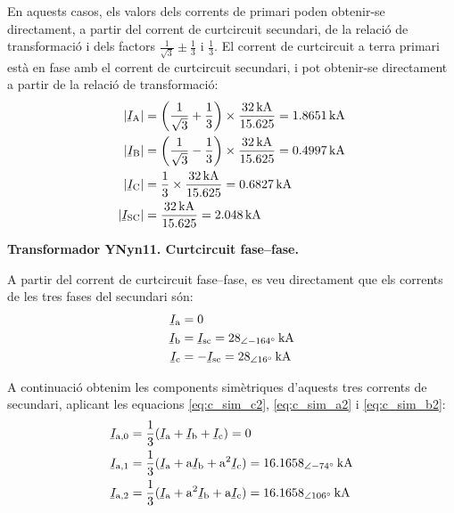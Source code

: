 \begin{exemple}
    En aquests casos, els valors dels corrents de primari poden obtenir-se directament, a partir del corrent de curtcircuit secundari, de la relació de transformació i dels factors $\frac{1}{\sqrt{3}} \pm \frac{1}{3}$ i $\frac{1}{3}$. El corrent de curtcircuit a terra primari està en fase amb el corrent de curtcircuit secundari, i pot obtenir-se directament a partir de la relació de transformació:
    \begin{align*}
        |\cmplx{I}\ped{A}| &= \left(\frac{1}{\sqrt{3}}+\frac{1}{3}\right) \times \frac{\SI{32}{kA}}{\num{15,625}} = \SI{1,8651}{kA} \\
        |\cmplx{I}\ped{B}| &= \left(\frac{1}{\sqrt{3}}-\frac{1}{3}\right) \times \frac{\SI{32}{kA}}{\num{15,625}} = \SI{0,4997}{kA} \\
        |\cmplx{I}\ped{C}| &= \frac{1}{3} \times \frac{\SI{32}{kA}}{\num{15,625}} = \SI{0,6827}{kA} \\
        |\cmplx{I}\ped{SC}| &= \frac{\SI{32}{kA}}{\num{15,625}} = \SI{2,048}{kA}
    \end{align*}


    \textbf{ Transformador YNyn11. Curtcircuit fase--fase.}

    \begin{center}
       
    \end{center}

    A partir del corrent de curtcircuit fase--fase, es veu directament que els corrents de les tres fases del secundari són:
    \begin{align*}
        \cmplx{I}\ped{a} &= 0  \\
        \cmplx{I}\ped{b} &= \cmplx{I}\ped{sc} = \SIpd{28}{-164}{kA}  \\
        \cmplx{I}\ped{c} &= -\cmplx{I}\ped{sc} = \SIpd{28}{16}{kA}
    \end{align*}

    A continuació obtenim les components simètriques d'aquests tres corrents de secundari, aplicant les equacions \eqref{eq:c_sim_c2}, \eqref{eq:c_sim_a2} i \eqref{eq:c_sim_b2}:
    \begin{align*}
        \cmplx{I}\ped{a,0} &= \frac{1}{3} (\cmplx{I}\ped{a} + \cmplx{I}\ped{b} +
        \cmplx{I}\ped{c}) = 0 \\
        \cmplx{I}\ped{a,1} &= \frac{1}{3} (\cmplx{I}\ped{a} + \au \cmplx{I}\ped{b} +
         \au^2 \cmplx{I}\ped{c}) = \SIpd{16,1658}{-74}{kA}  \\
        \cmplx{I}\ped{a,2} &= \frac{1}{3} (\cmplx{I}\ped{a} + \au^2 \cmplx{I}\ped{b} +
         \au \cmplx{I}\ped{c}) = \SIpd{16,1658}{106}{kA}
    \end{align*}


\end{exemple}
